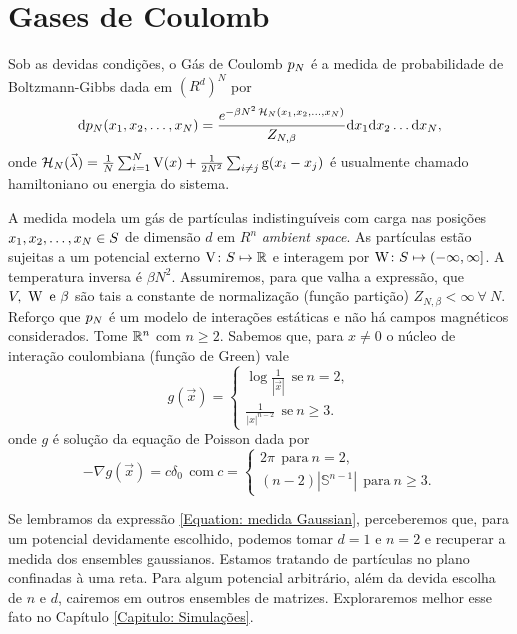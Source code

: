 \section{Gases de Coulomb}

Sob as devidas condições, o Gás de Coulomb $p_N$ é \cite{CoulombGaschafai} a medida de probabilidade de Boltzmann-Gibbs dada em $(R^d)^N$ por 
\begin{equation}
	\dd p_N(x_1, x_2, \dots, x_N) = \frac{e^{-\beta N^2 \operatorname{\mathcal{H}}_N(x_1, x_2, \dots, x_N)}}{Z_{N,\beta}} \dd x_1  \dd x_2  \dots  \dd x_N,
	\label{Equação: Medida Gas de Coulomb}
\end{equation}
onde $\operatorname{\mathcal{H}}_N(\vec{\lambda}) = \frac{1}{N} \sum_{i = 1}^{N} \operatorname{V}(x) + \frac{1}{2N^2} \sum_{i \neq j} \operatorname{g}(x_i - x_j)$ é usualmente chamado hamiltoniano ou energia do sistema.

A medida modela um gás de partículas indistinguíveis com carga nas posições $x_1, x_2, \dots, x_N \in S$ de dimensão $d$ em $R^n$ \textit{ambient space}. As partículas estão sujeitas a um potencial externo $\operatorname{V} \colon S \mapsto \mathbb{R}$ e interagem por $\operatorname{W} \colon S \mapsto (-\infty, \infty]$. A temperatura inversa é $\beta N^2$. Assumiremos, para que valha a expressão, que $V, \ \operatorname{W} \ \text{e} \ \beta$ são tais a constante de normalização (função partição) $Z_{N, \beta} < \infty \ \forall \ N$. Reforço que $p_N$ é um modelo de interações estáticas e não há campos magnéticos considerados. Tome $\mathbb{R}^n$ com $n \geq 2$. Sabemos que, para $x \neq 0$ o núcleo de interação coulombiana (função de Green) vale $$
	g(\vec{x}) =
	\begin{cases}
			\log \frac{1}{|\vec{x}|} \ \ \text{se} \ n = 2,\\
			\frac{1}{|x|^{n-2}} \ \ \text{se} \ n \geq 3.
	\end{cases}
$$ onde $g$ é solução da equação de Poisson dada por $$
	- \nabla g(\vec{x}) = c\delta_0 \ \ \text{com} \ c = 
	\begin{cases}
		2\pi \ \ \text{para} \ n = 2,\\
		(n-2) |\mathbb{S}^{n-1}| \ \ \text{para} \ n \geq 3.
	\end{cases}
$$

Se lembramos da expressão \ref{Equation: medida Gaussian}, perceberemos que, para um potencial devidamente escolhido, podemos tomar $d=1$ e $n = 2$ e recuperar a medida dos ensembles gaussianos. Estamos tratando de partículas no plano confinadas à uma reta. Para algum potencial arbitrário, além da devida escolha de $n$ e $d$, cairemos em outros ensembles de matrizes. Exploraremos melhor esse fato no Capítulo \ref{Capitulo: Simulações}.